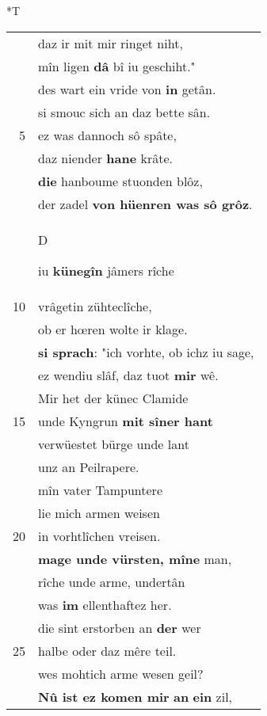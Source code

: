 \documentclass[8pt,a4paper,notitlepage]{article}
\begin{document}
\begin{table}[ht]
\begin{minipage}[t]{0.5\linewidth}
\end{minipage}
\hspace{0.5cm}
\begin{minipage}[t]{0.5\linewidth}
\small
\begin{center}*T
\end{center}
\begin{tabular}{rl}
 & daz ir mit mir ringet niht,\\ 
 & mîn ligen \textbf{dâ} bî iu geschiht."\\ 
 & des wart ein vride von \textbf{in} getân.\\ 
 & si smouc sich an daz bette sân.\\ 
5 & ez was dannoch sô spâte,\\ 
 & daz niender \textbf{hane} krâte.\\ 
 & \textbf{die} hanboume stuonden blôz,\\ 
 & der zadel \textbf{von hüenren was sô grôz}.\\ 
 & \begin{large}D\end{large}iu \textbf{künegîn} jâmers rîche\\ 
10 & vrâgetin zühteclîche,\\ 
 & ob er hœren wolte ir klage.\\ 
 & \textbf{si sprach}: "ich vorhte, ob ichz iu sage,\\ 
 & ez wendiu slâf, daz tuot \textbf{mir} wê.\\ 
 & Mir het der künec Clamide\\ 
15 & unde Kyngrun \textbf{mit sîner hant}\\ 
 & verwüestet bürge unde lant\\ 
 & unz an Peilrapere.\\ 
 & mîn vater Tampuntere\\ 
 & lie mich armen weisen\\ 
20 & in vorhtlîchen vreisen.\\ 
 & \textbf{mage unde vürsten, mîne} man,\\ 
 & rîche unde arme, undertân\\ 
 & was \textbf{im} ellenthaftez her.\\ 
 & die sint erstorben an \textbf{der} wer\\ 
25 & halbe oder daz mêre teil.\\ 
 & wes mohtich arme wesen geil?\\ 
 & \textbf{Nû ist ez komen mir} \textbf{an} \textbf{ein} zil,\\ 

\end{tabular}
\end{minipage}
\end{table}
\end{document}
